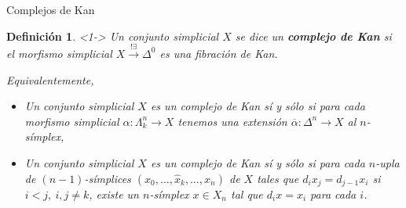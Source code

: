 \documentclass[11pt]{beamer}
\renewcommand{\ss}[1]{\Delta^{#1}}
\newcommand{\horn}[2]{\Lambda^{#1}_{#2}}
\newtheorem{defs}{Definición}
\begin{document}
\begin{frame}{Complejos de Kan}
\begin{defs} <1-> Un conjunto simplicial $X$ se dice un \textbf{complejo de Kan} si el morfismo simplicial $X \xrightarrow{!\exists} \ss{0}$ es una fibración de Kan.

Equivalentemente, 
\begin{itemize}
\item <2-> Un conjunto simplicial $X$ es un complejo de Kan sí y sólo si para cada morfismo simplicial $\alpha : \horn{n}{k} \to X$ tenemos una extensión $\overline{\alpha} : \ss{n} \to X$ al $n$-símplex,
\begin{center}
\end{center}
\item <3-> Un conjunto simplicial $X$ es un complejo de Kan sí y sólo si para cada $n$-upla de $(n-1)$-símplices $(x_0,\dots,\widehat{x}_k,\dots, x_n)$ de $X$ tales que $d_ix_j = d_{j-1}x_i$ si $i < j, \ i,j \neq k$, existe un $n$-símplex $x \in X_n$ tal que $d_ix = x_i$ para cada $i$.
\end{itemize}
\end{defs}
\end{frame}
\end{document}
